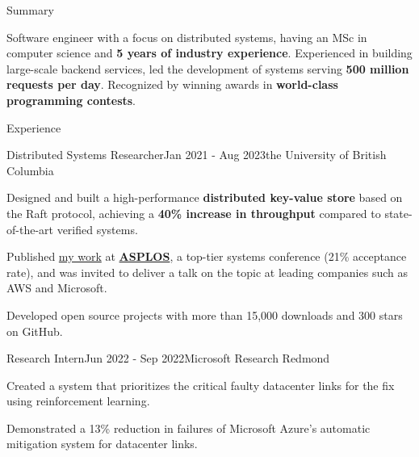 \documentclass[
	10pt, %
]{resume} %
\begin{document}

\begin{rSection}{Summary}

  Software engineer with a focus on distributed systems, having an MSc in computer
  science and \textbf{5 years of industry experience}. Experienced in building
  large-scale backend services, led the development of systems serving
  \textbf{500 million requests per day}. Recognized by winning awards in
  \textbf{world-class programming contests}.

\end{rSection}


\begin{rSection}{Experience}

  \begin{rSubsection}{Distributed Systems Researcher}{Jan 2021 - Aug 2023}{\textnormal{the} University of British Columbia}{}

    \item Designed and built a high-performance \textbf{distributed key-value store} based
      on the Raft protocol, achieving a \textbf{40\% increase in throughput} compared to 
      state-of-the-art verified systems.

    \item Published \href{https://dl.acm.org/doi/10.1145/3575693.3575695}{my work} 
      at \href{https://asplos-conference.org/}{\textbf{ASPLOS}}, a top-tier systems
      conference (21\% acceptance rate), and was
      invited to deliver a talk on the topic at leading companies such as AWS and
      Microsoft.

    \item Developed open source projects with more than 15,000 downloads and 300 stars on GitHub.

	\end{rSubsection}

  \begin{rSubsection}{Research Intern}{Jun 2022 - Sep 2022}{Microsoft Research Redmond}{}

    \item Created a system that prioritizes the critical faulty datacenter links
      for the fix using reinforcement learning.

    \item Demonstrated a 13\% reduction in failures of Microsoft Azure's automatic
    mitigation system for datacenter links. 


\end{rSubsection}
\end{rSection}
\end{document}
